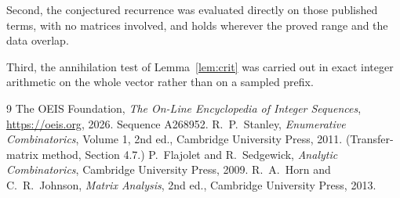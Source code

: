 \documentclass[11pt,a4paper]{article}
\theoremstyle{plain}
\theoremstyle{definition}
\begin{document}
Second, the conjectured recurrence was evaluated directly on those published terms, with no
matrices involved, and holds wherever the proved range and the data overlap.

Third, the annihilation test of Lemma~\ref{lem:crit} was carried out in exact integer
arithmetic on the whole vector rather than on a sampled prefix.

\begin{thebibliography}{9}
 The OEIS Foundation, \emph{The On-Line Encyclopedia of Integer
Sequences}, \url{https://oeis.org}, 2026. Sequence A268952.
 R.~P.~Stanley, \emph{Enumerative Combinatorics}, Volume 1, 2nd ed.,
Cambridge University Press, 2011. (Transfer-matrix method, Section 4.7.)
 P.~Flajolet and R.~Sedgewick, \emph{Analytic Combinatorics}, Cambridge
University Press, 2009.
 R.~A.~Horn and C.~R.~Johnson, \emph{Matrix Analysis}, 2nd ed., Cambridge
University Press, 2013.
\end{thebibliography}
\end{document}
